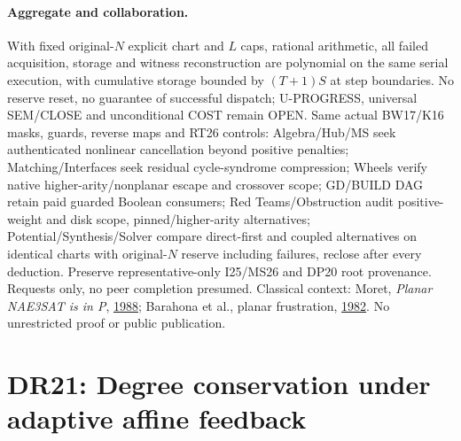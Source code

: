 \documentclass[11pt]{article}
\begin{document}
\paragraph{Aggregate and collaboration.} With fixed original-$N$ explicit chart and $L$ caps, rational arithmetic, all failed acquisition, storage and witness reconstruction are polynomial on the same serial execution, with cumulative storage bounded by $(T+1)S$ at step boundaries. No reserve reset, no guarantee of successful dispatch; U-PROGRESS, universal SEM/CLOSE and unconditional COST remain OPEN. Same actual BW17/K16 masks, guards, reverse maps and RT26 controls: Algebra/Hub/MS seek authenticated nonlinear cancellation beyond positive penalties; Matching/Interfaces seek residual cycle-syndrome compression; Wheels verify native higher-arity/nonplanar escape and crossover scope; GD/BUILD DAG retain paid guarded Boolean consumers; Red Teams/Obstruction audit positive-weight and disk scope, pinned/higher-arity alternatives; Potential/Synthesis/Solver compare direct-first and coupled alternatives on identical charts with original-$N$ reserve including failures, reclose after every deduction. Preserve representative-only I25/MS26 and DP20 root provenance. Requests only, no peer completion presumed. Classical context: Moret, \emph{Planar NAE3SAT is in P}, \href{https://doi.org/10.1145/49097.49099}{1988}; Barahona et al., planar frustration, \href{https://doi.org/10.1088/0305-4470/15/2/033}{1982}. No unrestricted proof or public publication.


\section{DR21: Degree conservation under adaptive affine feedback}\label{sec:dr21}
\end{document}
